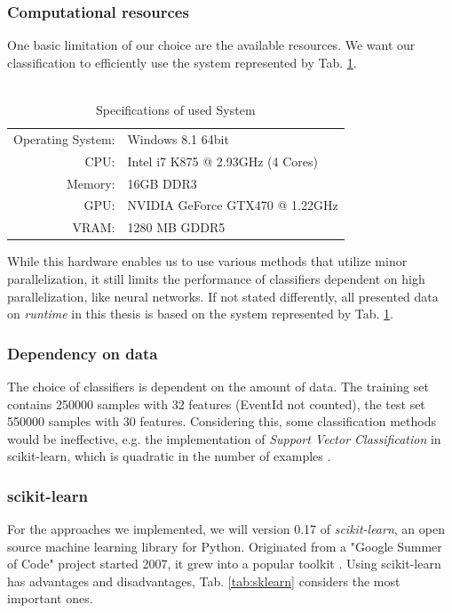\subsubsection{Computational resources}
One basic limitation of our choice are the available resources.
We want our classification to efficiently use the system represented by Tab. \ref{tab:specs}.

\begin{table}
  	\begin{tabular}{r l||}
		Operating System: & Windows 8.1 64bit\\
		CPU: & Intel i7 K875 @ 2.93GHz (4 Cores)\\
		Memory: & 16GB DDR3\\
		GPU: & NVIDIA GeForce GTX470 @ 1.22GHz\\
		VRAM: & 1280 MB GDDR5\\
	\end{tabular}
	\caption{\\Specifications of used System}
	\label{tab:specs}
\end{table}

While this hardware enables us to use various methods that utilize minor  parallelization, it still limits the performance of classifiers dependent on high parallelization, like neural networks. If not stated differently, all presented data on \emph{runtime} in this thesis is based on the system represented by Tab. \ref{tab:specs}.

\subsubsection{Dependency on data}
The choice of classifiers is dependent on the amount of data. The training set contains 250000 samples with 32 features (EventId not counted), the test set 550000 samples with 30 features. Considering this, some classification methods would be ineffective, e.g. the implementation of \emph{Support Vector Classification} in scikit-learn, which is quadratic in the number of examples \cite{sklearn}.

\subsubsection{scikit-learn}
For the approaches we implemented, we will version 0.17 of \emph{scikit-learn}, an open source machine learning library for Python. Originated from a "Google Summer of Code" project started 2007, it grew into a popular toolkit \cite{sklearn}.
Using scikit-learn has advantages and disadvantages, Tab. \ref{tab:sklearn} considers the most important ones.

